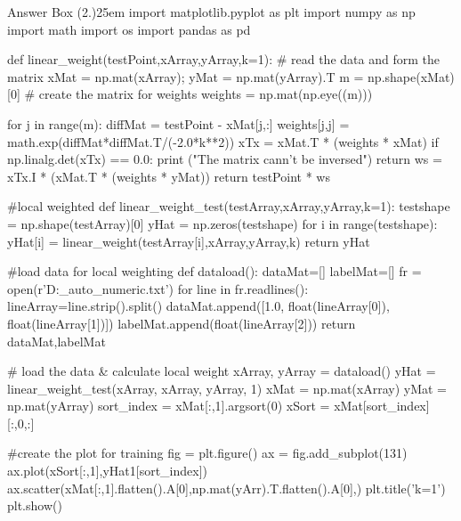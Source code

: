 \documentclass[12pt]{article}
\begin{document}
\begin{code}{Answer Box (2.)}{25em}
import matplotlib.pyplot as plt
import numpy as np
import math
import os
import pandas as pd

def linear_weight(testPoint,xArray,yArray,k=1):
    # read the data and form the matrix
    xMat = np.mat(xArray);   yMat = np.mat(yArray).T
    m = np.shape(xMat)[0]
    # create the matrix for weights
    weights = np.mat(np.eye((m)))

    for j in range(m):  
        diffMat = testPoint - xMat[j,:]
        weights[j,j] = math.exp(diffMat*diffMat.T/(-2.0*k**2))
    xTx = xMat.T * (weights * xMat)  
    if np.linalg.det(xTx) == 0.0:
        print ("The matrix cann't be inversed")
        return
    ws = xTx.I * (xMat.T * (weights * yMat))
    return testPoint * ws

#local weighted
def linear_weight_test(testArray,xArray,yArray,k=1):
    testshape = np.shape(testArray)[0]
    yHat = np.zeros(testshape)
    for i in range(testshape): 
        yHat[i] = linear_weight(testArray[i],xArray,yArray,k)
    return yHat

#load data for local weighting
def dataload():
    dataMat=[]
    labelMat=[]
    fr = open(r'D:\IAML\assessment\datasets\train_auto_numeric.txt')
    for line in fr.readlines():
        lineArray=line.strip().split()
        dataMat.append([1.0, float(lineArray[0]), float(lineArray[1])])
        labelMat.append(float(lineArray[2]))
    return dataMat,labelMat

# load the data & calculate local weight
xArray, yArray = dataload()
yHat = linear_weight_test(xArray, xArray, yArray, 1)
xMat = np.mat(xArray)
yMat = np.mat(yArray)
sort_index = xMat[:,1].argsort(0)
xSort = xMat[sort_index][:,0,:]

#create the plot for training
fig = plt.figure()
ax = fig.add_subplot(131)
ax.plot(xSort[:,1],yHat1[sort_index])
ax.scatter(xMat[:,1].flatten().A[0],np.mat(yArr).T.flatten().A[0],)
plt.title('k=1')
plt.show()
\end{code}



\end{document}
